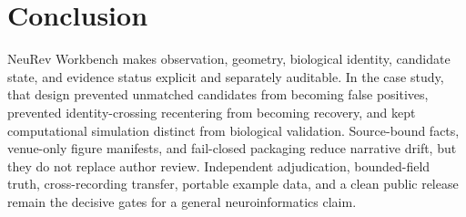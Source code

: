 \section{Conclusion}

NeuRev Workbench makes observation, geometry, biological identity, candidate
state, and evidence status explicit and separately auditable. In the case study,
that design prevented unmatched candidates from becoming false positives,
prevented identity-crossing recentering from becoming recovery, and kept
computational simulation distinct from biological validation. Source-bound
facts, venue-only figure manifests, and fail-closed packaging reduce narrative
drift, but they do not replace author review. Independent adjudication,
bounded-field truth, cross-recording transfer, portable example data, and a clean
public release remain the decisive gates for a general neuroinformatics claim.
